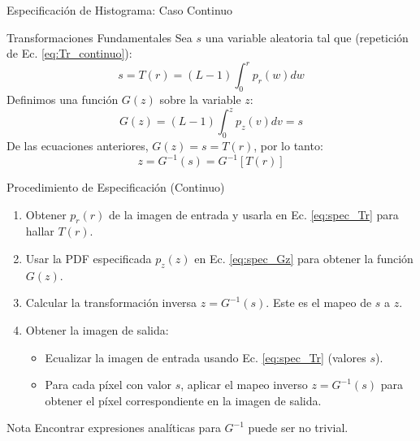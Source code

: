 \documentclass{beamer}
\begin{document}
\begin{frame}{Especificación de Histograma: Caso Continuo}
 \begin{alertblock}{Transformaciones Fundamentales}
  Sea $s$ una variable aleatoria tal que (repetición de Ec. \eqref{eq:Tr_continuo}):
  \begin{equation}
   s = T(r) = (L-1) \int_{0}^{r} p_r(w) dw \label{eq:spec_Tr}
  \end{equation}
  Definimos una función $G(z)$ sobre la variable $z$:
  \begin{equation}
   G(z) = (L-1) \int_{0}^{z} p_z(v) dv = s \label{eq:spec_Gz}
  \end{equation}
  De las ecuaciones anteriores, $G(z) = s = T(r)$, por lo tanto:
  \begin{equation}
   z = G^{-1}(s) = G^{-1}[T(r)] \label{eq:spec_z_transform}
  \end{equation}
 \end{alertblock}
\end{frame}

\begin{frame}{Procedimiento de Especificación (Continuo)}
 \begin{enumerate}
  \item Obtener $p_r(r)$ de la imagen de entrada y usarla en Ec. \eqref{eq:spec_Tr} para hallar $T(r)$.
  \item Usar la PDF especificada $p_z(z)$ en Ec. \eqref{eq:spec_Gz} para obtener la función $G(z)$.
  \item Calcular la transformación inversa $z = G^{-1}(s)$. Este es el mapeo de $s$ a $z$.
  \item Obtener la imagen de salida:
        \begin{itemize}
            \item Ecualizar la imagen de entrada usando Ec. \eqref{eq:spec_Tr} (valores $s$).
            \item Para cada píxel con valor $s$, aplicar el mapeo inverso $z=G^{-1}(s)$ para obtener el píxel correspondiente en la imagen de salida.
        \end{itemize}
 \end{enumerate}
 \begin{exampleblock}{Nota}
  Encontrar expresiones analíticas para $G^{-1}$ puede ser no trivial.
 \end{exampleblock}
\end{frame}
\end{document}

